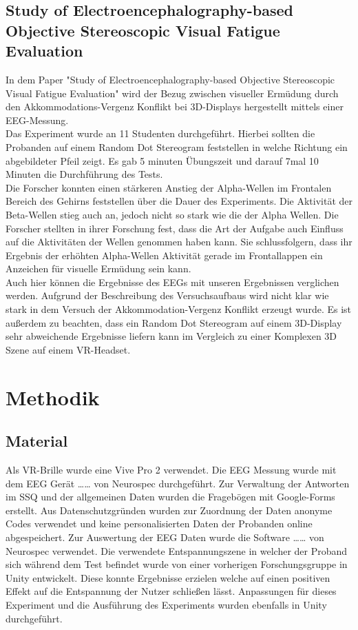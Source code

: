 \documentclass[conference]{IEEEtran}
\begin{document}
\subsection{Study of Electroencephalography-based Objective Stereoscopic Visual Fatigue Evaluation}
In dem Paper "Study of Electroencephalography-based Objective Stereoscopic Visual Fatigue Evaluation" \cite{b5} wird der Bezug zwischen visueller Ermüdung durch den Akkommodations-Vergenz Konflikt bei 3D-Displays hergestellt mittels einer EEG-Messung.\\
Das Experiment wurde an 11 Studenten durchgeführt. Hierbei sollten die Probanden auf einem Random Dot Stereogram feststellen in welche Richtung ein abgebildeter Pfeil zeigt. Es gab 5 minuten Übungszeit und darauf 7mal 10 Minuten die Durchführung des Tests.\\
Die Forscher konnten einen stärkeren Anstieg der Alpha-Wellen im Frontalen Bereich des Gehirns feststellen über die Dauer des Experiments. Die Aktivität der Beta-Wellen stieg auch an, jedoch nicht so stark wie die der Alpha Wellen. Die Forscher stellten in ihrer Forschung fest, dass die Art der Aufgabe auch Einfluss auf die Aktivitäten der Wellen genommen haben kann. Sie schlussfolgern, dass ihr Ergebnis der erhöhten Alpha-Wellen Aktivität gerade im Frontallappen ein Anzeichen für visuelle Ermüdung sein kann.\\
Auch hier können die Ergebnisse des EEGs mit unseren Ergebnissen verglichen werden. Aufgrund der Beschreibung des Versuchsaufbaus wird nicht klar wie stark in dem Versuch der Akkommodation-Vergenz Konflikt erzeugt wurde. Es ist außerdem zu beachten, dass ein Random Dot Stereogram auf einem 3D-Display sehr abweichende Ergebnisse liefern kann im Vergleich zu einer Komplexen 3D Szene auf einem VR-Headset.
 

\section{Methodik}
\subsection{Material}
Als VR-Brille wurde eine Vive Pro 2 verwendet. Die EEG Messung wurde mit dem EEG Gerät …… von Neurospec durchgeführt. Zur Verwaltung der Antworten im SSQ und der allgemeinen Daten wurden die Fragebögen mit Google-Forms erstellt. Aus Datenschutzgründen wurden zur Zuordnung der Daten anonyme Codes verwendet und keine personalisierten Daten der Probanden online abgespeichert. Zur Auswertung der EEG Daten wurde die Software …… von Neurospec verwendet. Die verwendete Entspannungszene in welcher der Proband sich während dem Test befindet wurde von einer vorherigen Forschungsgruppe in Unity entwickelt. Diese konnte Ergebnisse erzielen welche auf einen positiven Effekt auf die Entspannung der Nutzer schließen lässt. Anpassungen für dieses Experiment und die Ausführung des Experiments wurden ebenfalls in Unity durchgeführt.
\end{document}
